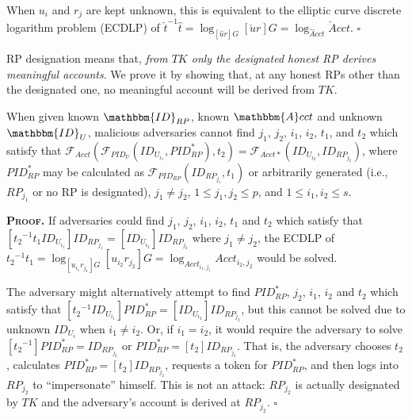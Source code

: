 When $u_{i}$ and $r_{j}$ are kept unknown, this is equivalent to the elliptic curve discrete logarithm problem (ECDLP) of $\check{t}^{-1}\hat{t} = \log_{[\hat{u}r]G}{[\check{u}r]G} = \log_{\hat{A}cct}{\check{A}cct}$.
\hfill $\square$

\vspace{1.5mm}

RP designation means that, \emph{from $TK$ only the designated honest RP derives meaningful accounts}.
We prove it by showing that,
    at any honest RPs other than the designated one, no meaningful account will be derived from $TK$.


\vspace{1.5mm}
\begin{thm}[RP Designation]
When given known $\mathbbm{ID}_{RP}$, known $\mathbbm{A}cct$ and unknown $\mathbbm{ID}_U$,
 malicious adversaries cannot find ${j_1}$, ${j_2}$, ${i_1}$, ${i_2}$, $t_1$, and $t_2$ which satisfy that $\mathcal{F}_{Acct}(\mathcal{F}_{PID_U}(ID_{U_{i_1}}, PID_{RP}^{*}), t_2) = \mathcal{F}_{Acct\ast}(ID_{U_{i_2}}, ID_{RP_{j_2}})$,
where $PID_{RP}^{*}$ may be calculated as $\mathcal{F}_{PID_{RP}}(ID_{RP_{j_1}}, t_1)$
    or arbitrarily generated (i.e., $RP_{j_1}$ or no RP is designated),
    ${j_1} \neq {j_2}$, $1 \leq j_1, j_2 \leq p$, and $1 \leq i_1, i_2 \leq s$.
\label{thm-rp-designation}
\end{thm}


\noindent\textbf{\textsc{Proof.}} 
If adversaries could find ${j_1}$, ${j_2}$, ${i_1}$, ${i_2}$, $t_1$ and $t_2$ which satisfy that $[{t_2}^{-1}t_1ID_{U_{i_1}}]ID_{RP_{j_1}} = [ID_{U_{i_2}}]ID_{RP_{j_2}}$
 where ${j_1} \neq {j_2}$,
 the ECDLP of ${t_2}^{-1}t_1 = \log_{[{u_{i_1}}{r_{j_1}}]G}{[{u_{i_2}}{r_{j_2}}]G}
 = \log_{Acct_{i_1,j_1}}{Acct_{i_2,j_2}}$ would be solved.

The adversary might alternatively attempt to find $PID_{RP}^{*}$, ${j_2}$, ${i_1}$, ${i_2}$ and $t_2$ which satisfy that $[{{t_2}^{-1}}ID_{U_{i_1}}]PID_{RP}^{*} = [ID_{U_{i_2}}]ID_{RP_{j_2}}$,
        but this cannot be solved due to unknown $ID_{U_{i}}$ when ${i_1} \neq {i_2}$.
Or, if ${i_1} = {i_2}$, 
    it would require the adversary to solve $[{{t_2}^{-1}}]PID_{RP}^{*} = ID_{RP_{j_2}}$
        or $PID_{RP}^{*} = [t_2]ID_{RP_{j_2}}$.
That is,
    the adversary chooses $t_2$, calculates $PID_{RP}^{*} = [t_2]ID_{RP_{j_2}}$, requests a token for $PID_{RP}^{*}$, and then logs into $RP_{j_2}$ to ``impersonate'' himself.
This is not an attack: $RP_{j_2}$ is actually designated by $TK$ and the adversary's account is derived at $RP_{j_2}$.
\hfill $\square$

